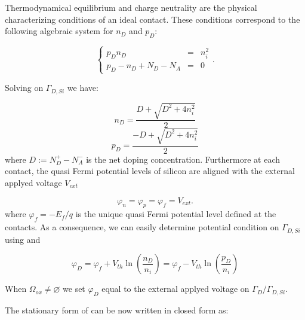 Thermodynamical equilibrium and charge neutrality are the physical characterizing conditions of an ideal contact. These conditions correspond to the following algebraic system for $n_D$ and $p_D$:

\begin{equation}
\label{eq: systemo for dirichlet condition}
\left\{
\begin{array}{lcl}
p_Dn_D & = &n_i^2 \\
p_D -n_D +N_D-N_A & = & 0 
\end{array}
\right. .
\end{equation}

Solving  on $\Gamma_{D,Si}$ we have:

\begin{equation}
n_D = \dfrac{D + \sqrt{D^2+4n_i^2}}{2}
\end{equation}
\begin{equation}
p_D = \dfrac{-D + \sqrt{D^2+4n_i^2}}{2}
\end{equation}
where $D := N_D^+ -N_A^-$ is the net doping concentration. Furthermore  at each contact, the quasi Fermi potential levels of silicon are aligned with the external applyed voltage $V_{ext}$

\begin{equation}
\varphi_n=\varphi_p=\varphi_f=V_{ext}.
\end{equation}
where $\varphi_f = - E_f / q$ is the unique quasi Fermi potential level defined at the contacts.
As a consequence, we can easily determine potential condition on $\Gamma_{D,Si}$ using  and 

\begin{equation}
\varphi_D = \varphi_f + V_{th}\ln\left( \dfrac{n_D}{n_i} \right) = \varphi_f - V_{th}\ln\left( \dfrac{p_D}{n_i} \right)
\end{equation}

 When $\Omega_{ox} \neq \varnothing$ we set $\varphi_D$ equal to the external applyed voltage on $\Gamma_D / \Gamma_{D,Si}$.


The stationary form of  can be now written in closed form as:
 

